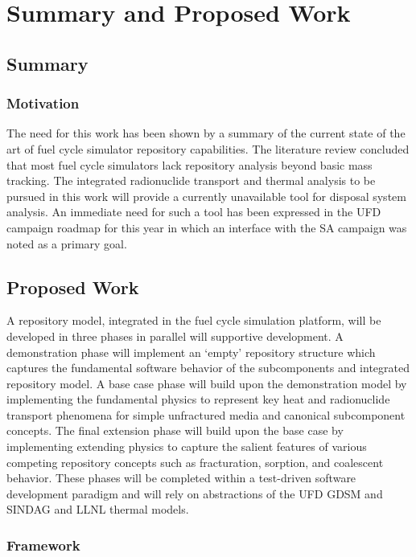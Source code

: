 \chapter{Summary and Proposed Work}\label{ch:future}

\section{Summary}

\subsection{Motivation}

The need for this work has been shown by a summary of the current state of the 
art of fuel cycle simulator repository capabilities. The literature review 
concluded that most fuel cycle simulators lack repository analysis beyond basic 
mass tracking. The integrated radionuclide transport and thermal analysis to be 
pursued in this work will provide a currently unavailable tool for disposal 
system analysis. An immediate need for such a tool has been expressed in the 
\gls{UFD} campaign roadmap for this year in which an interface with the \gls{SA} 
campaign was noted as a primary goal. 

\section{Proposed Work}

A repository model, integrated in the \Cyclus fuel cycle simulation platform, 
will be developed in three phases in parallel will supportive \Cyclus 
development. A demonstration phase will implement an `empty' repository 
structure which captures the fundamental software behavior of the subcomponents 
and integrated repository model. A base case phase will build upon the 
demonstration model by implementing the fundamental physics to represent key heat 
and radionuclide transport phenomena for simple unfractured media and canonical  
subcomponent concepts. The final extension phase will build upon the base case 
by implementing extending physics to capture the salient features of various 
competing repository concepts such as fracturation, sorption, and coalescent 
behavior. These phases will be completed within a test-driven software 
development paradigm and will rely on abstractions of the \gls{UFD} \gls{GDSM} 
and \gls{SINDAG} and \gls{LLNL} thermal models.  

\subsection{\Cyclus Framework}

